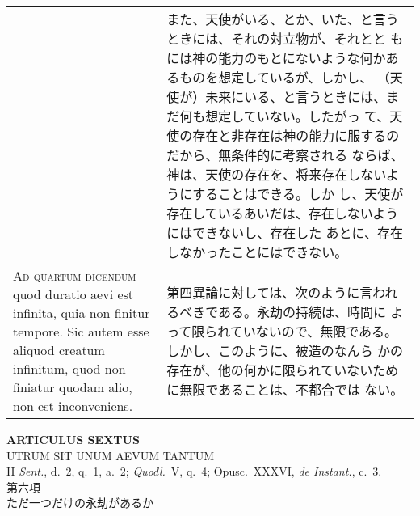 \documentclass[10pt]{jsarticle} %
\begin{document}
\begin{longtable}{p{21em}p{21em}}
&

また、天使がいる、とか、いた、と言うときには、それの対立物が、それとと
もには神の能力のもとにないような何かあるものを想定しているが、しかし、
（天使が）未来にいる、と言うときには、まだ何も想定していない。したがっ
て、天使の存在と非存在は神の能力に服するのだから、無条件的に考察される
ならば、神は、天使の存在を、将来存在しないようにすることはできる。しか
し、天使が存在しているあいだは、存在しないようにはできないし、存在した
あとに、存在しなかったことにはできない。


\\


{\scshape Ad quartum dicendum} quod duratio aevi est infinita, quia non
 finitur tempore. Sic autem esse aliquod creatum infinitum, quod non
 finiatur quodam alio, non est inconveniens.


&


第四異論に対しては、次のように言われるべきである。永劫の持続は、時間に
よって限られていないので、無限である。しかし、このように、被造のなんら
かの存在が、他の何かに限られていないために無限であることは、不都合では
ない。

\end{longtable}


\newpage
{}

\begin{center}
 {\Large {\bf ARTICULUS SEXTUS}}\\
 {\large UTRUM SIT UNUM AEVUM TANTUM}\\
 {\footnotesize II {\itshape Sent.}, d.~2, q.~1, a.~2; {\itshape
 Quodl.}~V, q.~4; Opusc.~XXXVI, {\itshape de Instant.}, c.~3.}\\
 {\Large 第六項\\ただ一つだけの永劫があるか}
\end{center}
\end{document}
